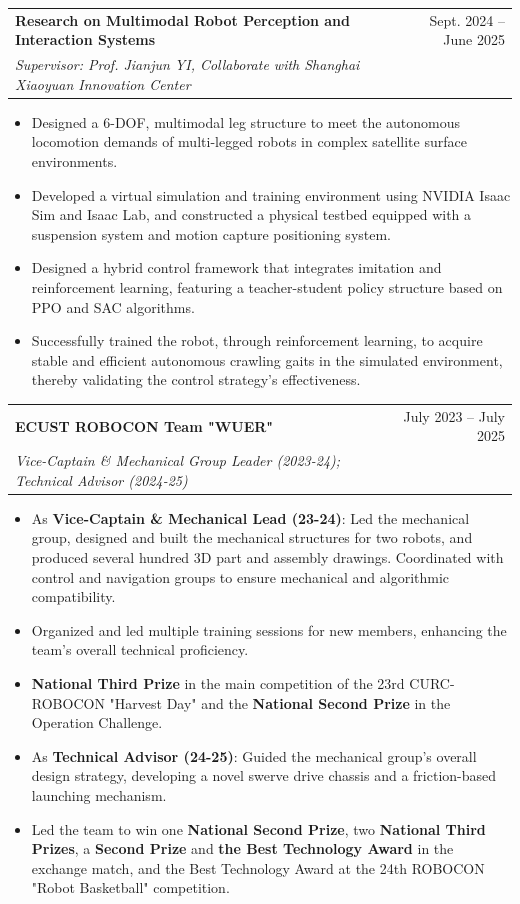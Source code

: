 \documentclass[letterpaper,11pt]{article}
\makeatletter
\newcommand{\resumeItem}[1]{
  \item\small{
    {#1 \vspace{-2pt}}
  }
}
\newcommand{\resumeSubheading}[4]{
  \vspace{-2pt}\item
    \begin{tabular*}{0.97\textwidth}[t]{l@{\extracolsep{\fill}}r}
      \textbf{#1} & #2 \\
      \textit{\small#3} & \textit{\small #4} \\
    \end{tabular*}\vspace{-7pt}
}
\newcommand{\resumeItemListStart}{\begin{itemize}}
\newcommand{\resumeItemListEnd}{\end{itemize}\vspace{-5pt}}
\makeatother
\begin{document}
    \resumeSubheading
      {Research on Multimodal Robot Perception and Interaction Systems}{Sept. 2024 -- June 2025}
      {Supervisor: Prof. Jianjun YI, Collaborate with Shanghai Xiaoyuan Innovation Center}{}
          \resumeItemListStart
            \resumeItem{Designed a 6-DOF, multimodal leg structure to meet the autonomous locomotion demands of multi-legged robots in complex satellite surface environments.}
            \resumeItem{Developed a virtual simulation and training environment using NVIDIA Isaac Sim and Isaac Lab, and constructed a physical testbed equipped with a suspension system and motion capture positioning system.}
            \resumeItem{Designed a hybrid control framework that integrates imitation and reinforcement learning, featuring a teacher-student policy structure based on PPO and SAC algorithms. }
            \resumeItem{Successfully trained the robot, through reinforcement learning, to acquire stable and efficient autonomous crawling gaits in the simulated environment, thereby validating the control strategy's effectiveness.}
          \resumeItemListEnd

    \resumeSubheading
      {ECUST ROBOCON Team "WUER"}{July 2023 -- July 2025}
      {Vice-Captain \& Mechanical Group Leader (2023-24); Technical Advisor (2024-25)}{}
          \resumeItemListStart
            \resumeItem{As \textbf{Vice-Captain \& Mechanical Lead (23-24)}: Led the mechanical group, designed and built the mechanical structures for two robots, and produced several hundred 3D part and assembly drawings. Coordinated with control and navigation groups to ensure mechanical and algorithmic compatibility.}
            \resumeItem{Organized and led multiple training sessions for new members, enhancing the team's overall technical proficiency.}
            \resumeItem{\textbf{National Third Prize} in the main competition of the 23rd CURC-ROBOCON "Harvest Day" and the \textbf{National Second Prize} in the Operation Challenge.}
            \resumeItem{As \textbf{Technical Advisor (24-25)}: Guided the mechanical group's overall design strategy, developing a novel swerve drive chassis and a friction-based launching mechanism.}
            \resumeItem{Led the team to win one \textbf{National Second Prize}, two \textbf{National Third Prizes}, a \textbf{Second Prize} and \textbf{the Best Technology Award} in the exchange match, and the Best Technology Award at the 24th ROBOCON "Robot Basketball" competition.}
          \resumeItemListEnd
\end{document}

